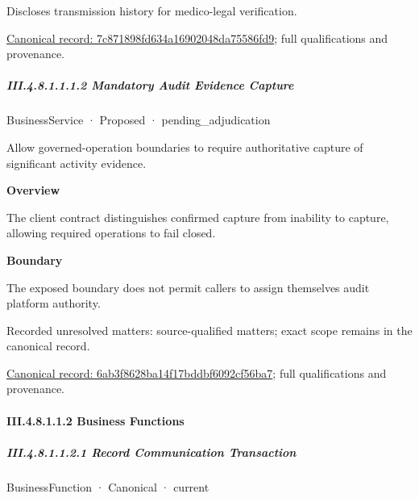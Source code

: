 Discloses transmission history for medico-legal verification.


{\footnotesize \href{../../../../../../../continuum/business/business-service/7c871898fd634a16902048da75586fd9.md}{Canonical record: 7c871898fd634a16902048da75586fd9}; full qualifications and provenance.}\par
\subparagraph*{III.4.8.1.1.1.2 Mandatory Audit Evidence Capture}
\label{navigation:III.4.8.1.1.1.2}

\label{element:6ab3f8628ba14f17bddbf6092cf56ba7}
{\small BusinessService · Proposed · pending\_adjudication}\par

Allow governed-operation boundaries to require authoritative capture of significant activity evidence.



\textbf{Overview}



The client contract distinguishes confirmed capture from inability to capture, allowing required operations to fail closed.



\textbf{Boundary}



The exposed boundary does not permit callers to assign themselves audit platform authority.


{\small Recorded unresolved matters: source-qualified matters; exact scope remains in the canonical record.}\par
{\footnotesize \href{../../../../../../../continuum/business/business-service/6ab3f8628ba14f17bddbf6092cf56ba7.md}{Canonical record: 6ab3f8628ba14f17bddbf6092cf56ba7}; full qualifications and provenance.}\par
\paragraph*{III.4.8.1.1.2 Business Functions}
\label{navigation:III.4.8.1.1.2}

\subparagraph*{III.4.8.1.1.2.1 Record Communication Transaction}
\label{navigation:III.4.8.1.1.2.1}

\label{element:d64ced698052400fa7892e4d768b3f8f}
{\small BusinessFunction · Canonical · current}\par

